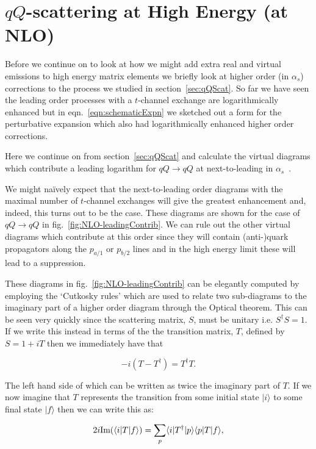\section{$qQ$-scattering at High Energy (at NLO)}
	\label{sub:HE22_NLO}

	Before we continue on to look at how we might add extra real and virtual emissions to high energy matrix
	elements we briefly look at higher order (in $\alpha_s$) corrections to the process we studied in
	section~\ref{sec:qQScat}.  So far we have seen the leading order processes with a $t$-channel
	exchange are logarithmically enhanced but in eqn.~\eqref{eqn:schematicExpn} we sketched out a form for
	the perturbative expansion which also had logarithmically enhanced higher order corrections.

	Here we continue on from section~\ref{sec:qQScat} and calculate the virtual diagrams which contribute
	a leading logarithm for $qQ\to qQ$ at next-to-leading in $\alpha_s$~\cite{sabioThesis,DelDuca:1995hf}.

	We might na\"ively expect that the next-to-leading order diagrams with the maximal number of $t$-channel exchanges
	will give the greatest enhancement and, indeed, this turns out to be the case.  These diagrams are shown
	for the case of $qQ\rightarrow qQ$ in fig.~\eqref{fig:NLO-leadingContrib}.  We can rule out the other
	virtual diagrams which contribute at this order since they will contain (anti-)quark propagators along
	the $p_{a/1}$ or $p_{b/2}$ lines and in the high energy limit these will lead to a suppression.

	These diagrams in fig.~\eqref{fig:NLO-leadingContrib} can be elegantly computed by employing the `Cutkosky
	rules' which are used to relate two sub-diagrams to the imaginary part of a higher order diagram through
	the Optical theorem.  This can be seen very quickly since the scattering matrix, $S$, must be unitary i.e.
	$S^\dagger S=1$.  If we write this instead in terms of the the transition matrix, $T$, defined by $S=1+iT$
	then we immediately have that

	\begin{equation}
		-i(T - T^\dagger) = T^\dagger T.
	\end{equation}

	The left hand side of which can be written as twice the imaginary part of $T$.  If we now imagine
	that $T$ represents the transition from some initial state $|i\rangle$ to some final state
	$|f\rangle$ then we can write this as:

	\begin{equation}
		2i\text{Im}(\langle i | T | f \rangle) =  \sum_{p}\langle i | T^\dagger | p \rangle\langle p | T | f \rangle,
	\end{equation}

